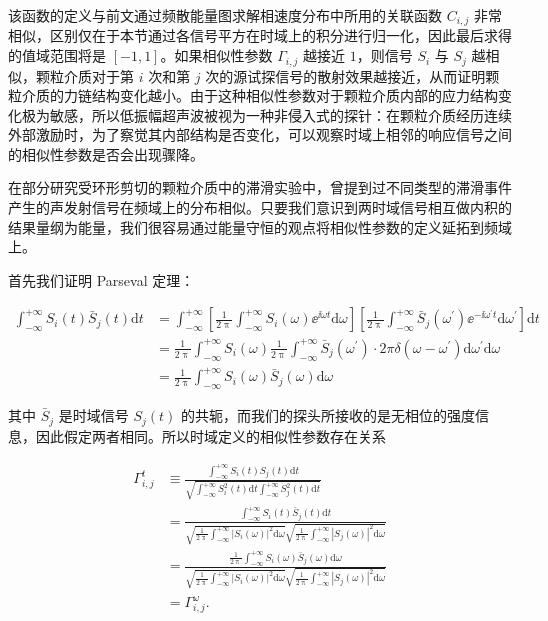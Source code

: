 该函数的定义与前文通过频散能量图求解相速度分布中所用的关联函数 $C_{i,j}$ 非常相似，区别仅在于本节通过各信号平方在时域上的积分进行归一化，因此最后求得的值域范围将是 $[-1,1]$。如果相似性参数 $\Gamma_{i,j}$ 越接近 $1$，则信号 $S_{i}$ 与 $S_{j}$ 越相似，颗粒介质对于第 $i$ 次和第 $j$ 次的源试探信号的散射效果越接近，从而证明颗粒介质的力链结构变化越小。由于这种相似性参数对于颗粒介质内部的应力结构变化极为敏感，所以低振幅超声波被视为一种非侵入式的探针：在颗粒介质经历连续外部激励时，为了察觉其内部结构是否变化，可以观察时域上相邻的响应信号之间的相似性参数是否会出现骤降。

在部分研究受环形剪切的颗粒介质中的滞滑实验中，曾提到过不同类型的滞滑事件产生的声发射信号在频域上的分布相似\cite{doi:10.1073/pnas.2305134120}。只要我们意识到两时域信号相互做内积的结果量纲为能量，我们很容易通过能量守恒的观点将相似性参数的定义延拓到频域上。

首先我们证明 Parseval 定理：

\begin{equation}
  \begin{aligned}
    \int_{-\infty}^{+\infty}S_{i}(t)\bar{S}_{j}(t)\mathrm{d}t &= \int_{-\infty}^{+\infty}\left[\frac{1}{2\uppi}\int_{-\infty}^{+\infty}S_{i}(\omega){\ee}^{\ii \omega t}\mathrm{d}\omega\right]\left[\frac{1}{2\uppi}\int_{-\infty}^{+\infty}\bar{S}_{j}(\omega^{\prime}){\ee}^{-\ii \omega^{\prime}t}\mathrm{d}\omega^{\prime}\right]\mathrm{d}t\\
    &= \frac{1}{2\uppi}\int_{-\infty}^{+\infty}S_{i}(\omega)\frac{1}{2\uppi}\int_{-\infty}^{+\infty}\bar{S}_{j}(\omega^{\prime})\cdot 2\pi\delta(\omega-\omega^{\prime})\mathrm{d}\omega^{\prime}\mathrm{d}\omega\\
    &= \frac{1}{2\uppi}\int_{-\infty}^{+\infty}S_{i}(\omega)\bar{S}_{j}(\omega)\mathrm{d}\omega
  \end{aligned}
\end{equation}

其中 $\bar{S}_{j}$ 是时域信号 $S_{j}(t)$ 的共轭，而我们的探头所接收的是无相位的强度信息，因此假定两者相同。所以时域定义的相似性参数存在关系

\begin{equation}
  \begin{aligned}
    \Gamma_{i,j}^{t} &\equiv \frac{\int_{-\infty}^{+\infty}S_{i}(t)S_{j}(t)\mathrm{d}t}{\sqrt{\int_{-\infty}^{+\infty}S_{i}^{2}(t)\mathrm{d}t\int_{-\infty}^{+\infty}S_{j}^{2}(t)\mathrm{d}t}}\\
    &= \frac{\int_{-\infty}^{+\infty}S_{i}(t)\bar{S}_{j}(t)\mathrm{d}t}{\sqrt{\frac{1}{2\uppi}\int_{-\infty}^{+\infty}|S_{i}(\omega)|^{2}\mathrm{d}\omega}\sqrt{\frac{1}{2\uppi}\int_{-\infty}^{+\infty}|S_{j}(\omega)|^{2}\mathrm{d}\omega}}\\
    &= \frac{\frac{1}{2\uppi}\int_{-\infty}^{+\infty}S_{i}(\omega)\bar{S}_{j}(\omega)\mathrm{d}\omega}{\sqrt{\frac{1}{2\uppi}\int_{-\infty}^{+\infty}|S_{i}(\omega)|^{2}\mathrm{d}\omega}\sqrt{\frac{1}{2\uppi}\int_{-\infty}^{+\infty}|S_{j}(\omega)|^{2}\mathrm{d}\omega}}\\
    &= \Gamma_{i,j}^{\omega}.
  \end{aligned}
\end{equation}

